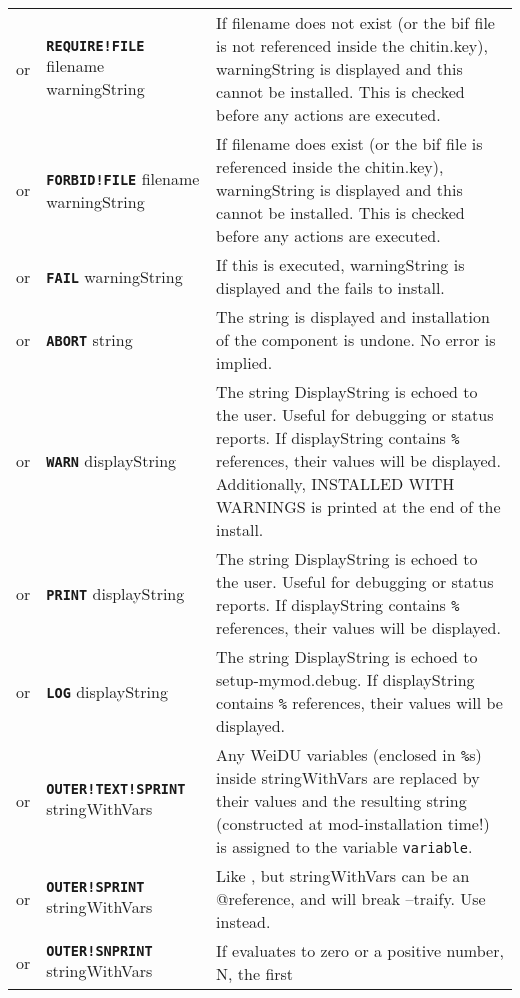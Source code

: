 \documentclass{article}
\def\ttref#1{\ahrefloc{#1}{\tt #1}}
\def\DEFINE#1{{\tt \bf #1}\label{#1}\index{#1}}
\def\t#1{{\tt #1}}
\begin{document}
\begin{tabular}{cp{10in}|p{10in}}
  or & \DEFINE{REQUIRE!FILE} filename warningString &
    If filename does not exist (or the bif file is not referenced inside
    the chitin.key), warningString is displayed and this
    \ttref{component} cannot be installed. This is checked before any
    actions are executed. \\
  or & \DEFINE{FORBID!FILE} filename warningString &
    If filename does exist (or the bif file is referenced inside
    the chitin.key), warningString is displayed and this
    \ttref{component} cannot be installed. This is checked before any
    actions are executed. \\
  or & \DEFINE{FAIL} warningString &
    If this \ttref{TP2 Action} is executed, warningString is displayed and
    the \ttref{component} fails to install. \\
  or & \DEFINE{ABORT} string &
    The string is displayed and installation of the component is undone.
    No error is implied. \\
  or & \DEFINE{WARN} displayString &
    The string DisplayString is echoed to the user. Useful for debugging or
    status reports. If displayString contains \t{\%}\ttref{variable}\t{\%}
    references, their values will be displayed. Additionally, INSTALLED WITH
    WARNINGS is printed at the end of the install.
    \\
  or & \DEFINE{PRINT} displayString &
    The string DisplayString is echoed to the user. Useful for debugging or
    status reports. If displayString contains \t{\%}\ttref{variable}\t{\%}
    references, their values will be displayed. \\
  or & \DEFINE{LOG} displayString &
    The string DisplayString is echoed to setup-mymod.debug.
    If displayString contains \t{\%}\ttref{variable}\t{\%}
    references, their values will be displayed. \\
or & \DEFINE{OUTER!TEXT!SPRINT} \ttref{variable} stringWithVars &
  Any WeiDU variables (enclosed in \t{\%}s) inside stringWithVars are
  replaced by their values and the resulting string (constructed at
  mod-installation time!) is assigned to the variable \t{variable}. \\
or & \DEFINE{OUTER!SPRINT} \ttref{variable} stringWithVars &
  Like \ttref{OUTER!TEXT!SPRINT}, but stringWithVars can be an @reference, and will
  break --traify. Use \ttref{OUTER!TEXT!SPRINT} instead. \\
or & \DEFINE{OUTER!SNPRINT} \ttref{value} \ttref{variable} stringWithVars &
  If \ttref{value} evaluates to zero or a positive number, N, the first

\end{tabular}
\end{document}

